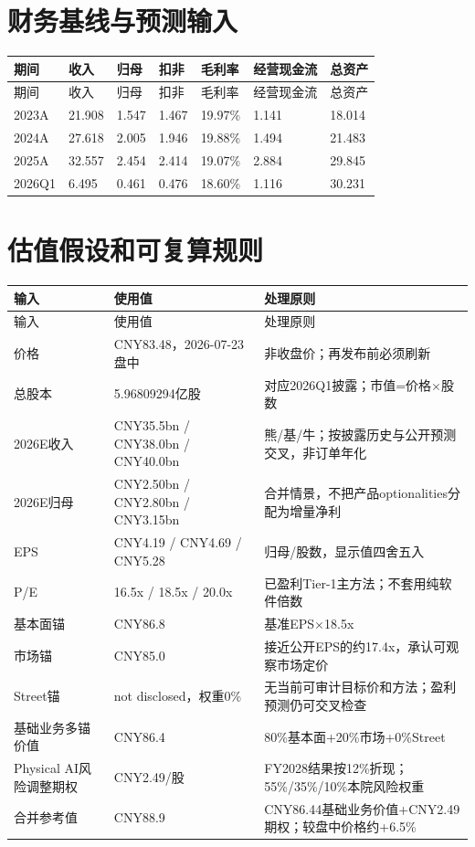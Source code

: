 \section{财务基线与预测输入}

\begin{longtable}{L{1.7cm}R{1.6cm}R{1.6cm}R{1.6cm}R{1.5cm}R{1.7cm}R{1.7cm}}
\toprule
期间 & 收入 & 归母 & 扣非 & 毛利率 & 经营现金流 & 总资产 \\
\midrule
\endfirsthead
\toprule
期间 & 收入 & 归母 & 扣非 & 毛利率 & 经营现金流 & 总资产 \\
\midrule
\endhead
2023A & 21.908 & 1.547 & 1.467 & 19.97\% & 1.141 & 18.014 \\
2024A & 27.618 & 2.005 & 1.946 & 19.88\% & 1.494 & 21.483 \\
2025A & 32.557 & 2.454 & 2.414 & 19.07\% & 2.884 & 29.845 \\
2026Q1 & 6.495 & 0.461 & 0.476 & 18.60\% & 1.116 & 30.231 \\
\bottomrule
\end{longtable}

\section{估值假设和可复算规则}

\begin{longtable}{L{3.2cm}L{4.4cm}L{5.0cm}}
\toprule
输入 & 使用值 & 处理原则 \\
\midrule
\endfirsthead
\toprule
输入 & 使用值 & 处理原则 \\
\midrule
\endhead
价格 & CNY83.48，2026-07-23盘中 & 非收盘价；再发布前必须刷新 \\
总股本 & 5.96809294亿股 & 对应2026Q1披露；市值=价格$\times$股数 \\
2026E收入 & CNY35.5bn / CNY38.0bn / CNY40.0bn & 熊/基/牛；按披露历史与公开预测交叉，非订单年化 \\
2026E归母 & CNY2.50bn / CNY2.80bn / CNY3.15bn & 合并情景，不把产品optionalities分配为增量净利 \\
EPS & CNY4.19 / CNY4.69 / CNY5.28 & 归母/股数，显示值四舍五入 \\
P/E & 16.5x / 18.5x / 20.0x & 已盈利Tier-1主方法；不套用纯软件倍数 \\
基本面锚 & CNY86.8 & 基准EPS$\times$18.5x \\
市场锚 & CNY85.0 & 接近公开EPS的约17.4x，承认可观察市场定价 \\
Street锚 & not disclosed，权重0\% & 无当前可审计目标价和方法；盈利预测仍可交叉检查 \\
基础业务多锚价值 & CNY86.4 & 80\%基本面+20\%市场+0\%Street \\
Physical AI风险调整期权 & CNY2.49/股 & FY2028结果按12\%折现；55\%/35\%/10\%本院风险权重 \\
合并参考值 & CNY88.9 & CNY86.44基础业务价值+CNY2.49期权；较盘中价格约+6.5\% \\
\bottomrule
\end{longtable}

